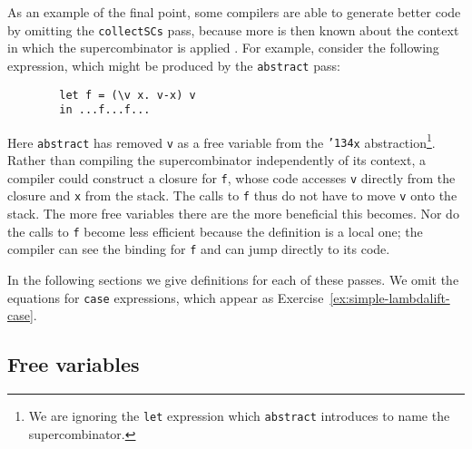 As an example of the final point, some compilers are able to generate
better code by omitting the \mbox{\tt collectSCs} pass, because more is then
known about the context in which the supercombinator is applied
\cite{STG2}.  For example, consider the following expression, which
might be produced by the \mbox{\tt abstract} pass:
\begin{verbatim}
        let f = (\v x. v-x) v
        in ...f...f...
\end{verbatim}
Here \mbox{\tt abstract} has removed \mbox{\tt v} as a free variable from the
\mbox{\tt {\char'134}x} abstraction\footnote{We are ignoring the \mbox{\tt let} expression which
\mbox{\tt abstract} introduces to name the supercombinator.}.  Rather than
compiling the supercombinator independently of its context, a compiler
could construct a closure for \mbox{\tt f}, whose code accesses \mbox{\tt v} directly
from the closure and \mbox{\tt x} from the stack.  The calls to \mbox{\tt f} thus do not
have to move \mbox{\tt v} onto the stack.  The more free variables there are
the more beneficial this becomes.  Nor do the calls to \mbox{\tt f} become less
efficient because the definition is a local one; the compiler can see
the binding for \mbox{\tt f} and can jump directly to its code.

In the following sections we give definitions for each of these
passes.  We omit the equations for \mbox{\tt case} expressions, which appear as
Exercise~\ref{ex:simple-lambdalift-case}.

\subsection{Free variables}

